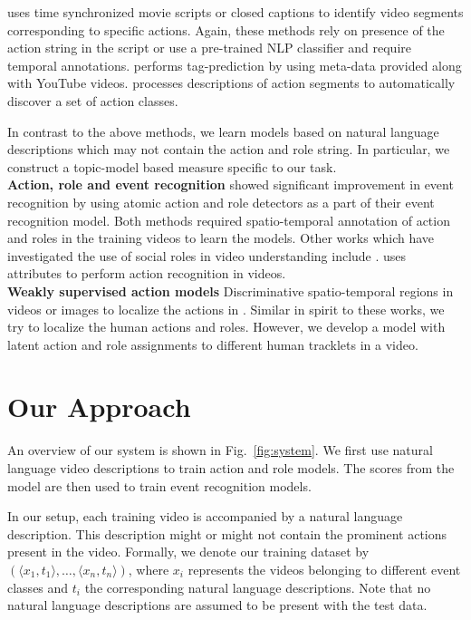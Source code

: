 \documentclass[10pt,twocolumn,letterpaper]{article}
\begin{document}
\cite{Laptev_CVPR08, Marszalek_CVPR09, Cour_ECCV08, Everingham_BMVC06} uses time synchronized movie scripts or closed captions to identify video segments corresponding to specific actions. Again, these methods rely on presence of the action string in the script or use a pre-trained NLP classifier \cite{Laptev_CVPR08} and require temporal annotations. \cite{Yang_CVPR11} performs tag-prediction by using meta-data provided along with YouTube videos. \cite{Motwani_ECAI12} processes descriptions of action segments to automatically discover a set of action classes.

In contrast to the above methods, we learn models based on natural language
descriptions which may not contain the action and role string. In particular, we
construct a topic-model based measure specific to our task.
\\
\noindent \textbf{Action, role and event recognition} \cite{Izadinia_ECCV12,
Lan_CVPR12} showed significant improvement in event recognition by using atomic
action and role detectors as a part of their event recognition model. Both
methods required spatio-temporal annotation of action and roles in the
training videos to learn the models. Other works which have investigated the
use of social roles in video understanding include \cite{Wang_ECCV10, Fathi_CVPR12}. \cite{Liu_CVPR11} uses attributes to perform action
recognition in videos. 
\\
\noindent \textbf{Weakly supervised action models} 
Discriminative spatio-temporal regions in videos or images to localize the actions in \cite{Satkin_ECCV10, Raptis_ECCV12, Singh_ECCV12}.
Similar in spirit to these works, we try to localize the human actions and roles. 
However, we develop a model with latent action and role assignments to different human tracklets in a video.

\section{Our Approach} \label{sec:model_formualation}

An overview of our system is shown in Fig.~\ref{fig:system}. We first use
natural language video descriptions to train action and role models.  The scores
from the model are then used to train event recognition models.

In our setup, each training video is accompanied by a natural language
description. This description might or might not contain the prominent actions 
present in the video.
Formally, we denote our training dataset by
$\left(\langle x_1, t_1 \rangle, \dots , \langle x_n, t_n\rangle \right)$,
where $x_i$ represents the videos belonging to different event classes and
$t_i$ the corresponding natural language descriptions. 
Note that no natural language descriptions are assumed to be present with the test
data.
\end{document}
